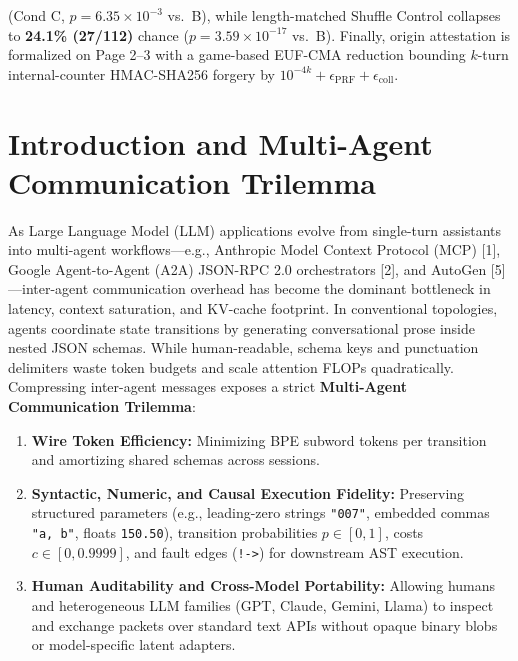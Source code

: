 \documentclass[9pt,a4paper]{extarticle}
\begin{document}
{\begin{minipage}{\dimexpr\textwidth-2\fboxsep-2\fboxrule\relax}
{(Cond C, $p = 6.35 \times 10^{-3}$ vs.\ B), while length-matched Shuffle Control collapses to \textbf{24.1\% (27/112)} chance ($p = 3.59 \times 10^{-17}$ vs.\ B). Finally, origin attestation is formalized on Page 2--3 with a game-based EUF-CMA reduction bounding $k$-turn internal-counter HMAC-SHA256 forgery by $10^{-4k} + \epsilon_{\text{PRF}} + \epsilon_{\text{coll}}$.
}
\vspace{1.0pt}
\end{minipage}%
}

\section{Introduction and Multi-Agent Communication Trilemma}
As Large Language Model (LLM) applications evolve from single-turn assistants into multi-agent workflows---e.g., Anthropic Model Context Protocol (MCP) [1], Google Agent-to-Agent (A2A) JSON-RPC 2.0 orchestrators [2], and AutoGen [5]---inter-agent communication overhead has become the dominant bottleneck in latency, context saturation, and KV-cache footprint. In conventional topologies, agents coordinate state transitions by generating conversational prose inside nested JSON schemas. While human-readable, schema keys and punctuation delimiters waste token budgets and scale attention FLOPs quadratically. Compressing inter-agent messages exposes a strict \textbf{Multi-Agent Communication Trilemma}:
\begin{enumerate}
  \item \textbf{Wire Token Efficiency:} Minimizing BPE subword tokens per transition and amortizing shared schemas across sessions.
  \item \textbf{Syntactic, Numeric, and Causal Execution Fidelity:} Preserving structured parameters (e.g., leading-zero strings \texttt{"007"}, embedded commas \texttt{"a, b"}, floats \texttt{150.50}), transition probabilities $p \in [0,1]$, costs $c \in [0, 0.9999]$, and fault edges (\texttt{!->}) for downstream AST execution.
  \item \textbf{Human Auditability and Cross-Model Portability:} Allowing humans and heterogeneous LLM families (GPT, Claude, Gemini, Llama) to inspect and exchange packets over standard text APIs without opaque binary blobs or model-specific latent adapters.
\end{enumerate}
\end{document}
